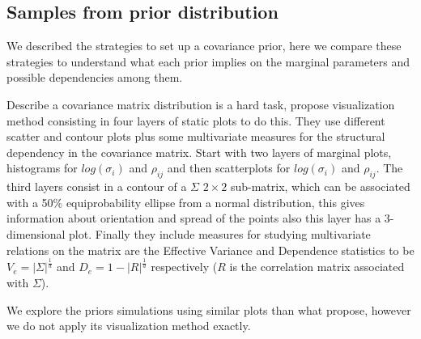 \documentclass{article}
\begin{document}
\subsection{Samples from  prior distribution} 
We described the strategies to set up a covariance prior, here we compare these strategies to understand what each prior implies on the marginal parameters and possible dependencies among them. 

Describe a covariance matrix distribution is a hard task, \cite{visualize} propose visualization method consisting in four layers of static plots to do this. They use different scatter and contour plots plus some multivariate measures for the structural dependency in the covariance matrix. Start with two layers of marginal plots, histograms for $log(\sigma_i)$ and $\rho_{ij}$ and then scatterplots for $log(\sigma_i)$ and $\rho_{ij}$. The third layers consist in a contour of a $\Sigma$ $2\times2$ sub-matrix, which can be associated with a 50\% equiprobability ellipse from a normal distribution, this gives information about orientation and spread of the points also this layer has a 3-dimensional plot. Finally they include measures for studying multivariate relations on the matrix are the Effective Variance and Dependence statistics to be $V_e = |\Sigma|^{\frac{1}{d}}$ and $D_e=1-|R|^{\frac{1}{d}}$ respectively ($R$ is the correlation matrix associated with $\Sigma$). 

We explore the priors simulations using similar plots than what \cite{visualize} propose, however we do not apply its visualization method exactly.  
\end{document}
